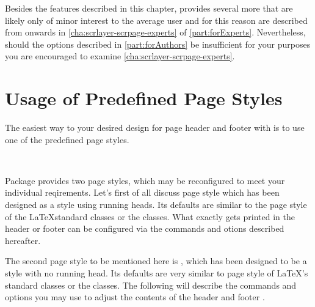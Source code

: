 Besides the features described in this chapter, 
provides several more that are likely only of minor interest to the average
user and for this reason are described from 
 onwards in
\autoref{cha:scrlayer-scrpage-experts} of \autoref{part:forExperts}.
Nevertheless, should the options described in \autoref{part:forAuthors} be
insufficient for your purposes you are encouraged to examine
\autoref{cha:scrlayer-scrpage-experts}.




\section{Usage of Predefined Page Styles}

The easiest way to your desired design for page header and footer with
 is to use one of the predefined page styles.

\begin{Declaration}
  \\
\end{Declaration}
%
%
Package  provides two page styles, which may be
reconfigured to meet your individual reqirements. Let's first of all discuss
page style  which has been designed as a style using
running heads. Its defaults are similar to the page style
 of the \LaTeX standard classes
or the \KOMAScript{} classes. What exactly gets printed in the header or
footer can be configured via the commands and otions described hereafter.

The second page style to be mentioned here is ,
which has been designed to be a style with no running head. Its defaults are
very similar to page style  of \LaTeX's
standard classes or the \KOMAScript{} classes. The following will describe the
commands and options you may use to adjust the contents of the header and
footer .

